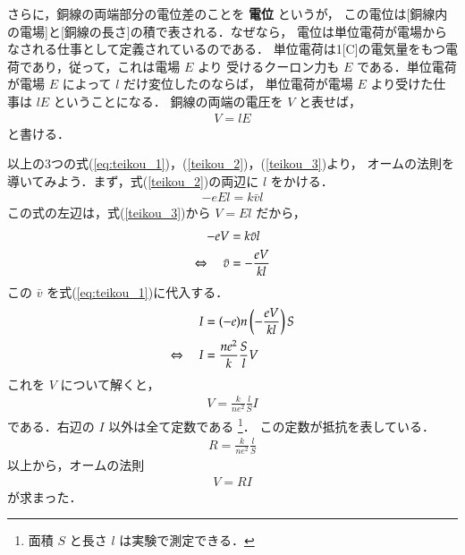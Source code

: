             さらに，銅線の両端部分の電位差のことを \textbf{電位} というが，
            この電位は[銅線内の電場]と[銅線の長さ]の積で表される．なぜなら，
            電位は単位電荷が電場からなされる仕事として定義されているのである．
            単位電荷は1[C]の電気量をもつ電荷であり，従って，これは電場 $E$ より
            受けるクーロン力も $E$ である．単位電荷が電場 $E$ によって $l$ だけ変位したのならば，
            単位電荷が電場 $E$ より受けた仕事は $lE$ ということになる．
            銅線の両端の電圧を $V$ と表せば，
                \begin{align}\label{teikou_3}
                    V=lE
                \end{align}
            と書ける．

            以上の3つの式(\ref{eq:teikou_1})，(\ref{teikou_2})，(\ref{teikou_3})より，
            オームの法則を導いてみよう．まず，式(\ref{teikou_2})の両辺に $l$ をかける．
                \begin{align*}
                    -eEl=k\bar{v}l
                \end{align*}
            この式の左辺は，式(\ref{teikou_3})から $V=El$ だから，
                \begin{align*}
                    -eV&=k\bar{v}l \notag \\
                    \Leftrightarrow \quad \bar{v}&=-\frac{eV}{kl}
                \end{align*}
            この $\bar{v}$ を式(\ref{eq:teikou_1})に代入する．
                \begin{align*}
                    I&=(-e)n\left(-\frac{eV}{kl}\right) S \notag \\
                    \Leftrightarrow \quad I&=\frac{ne^{2}}{k}\frac{S}{l}V
                \end{align*}
            これを $V$ について解くと，
                \begin{align}
                    V=\frac{k}{ne^{2}}\frac{l}{S}I
                \end{align}
            である．右辺の $I$ 以外は全て定数である
                \footnote{
                    面積 $S$ と長さ $l$ は実験で測定できる．
                }．
            この定数が抵抗を表している．
                \begin{align}
                    R=\frac{k}{ne^{2}}\frac{l}{S}
                \end{align}
            以上から，オームの法則
                \begin{align}
                    V=RI
                \end{align}
            が求まった．

